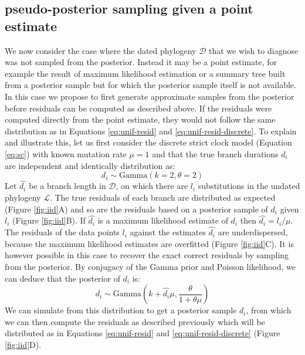 \documentclass{article}
\begin{document}
\subsection*{pseudo-posterior sampling given a point estimate}

We now consider the case where the dated phylogeny $\mathcal{D}$ that we wish
to diagnose was not sampled from the posterior. Instead it may be a point estimate, 
for example the result of maximum likelihood estimation
or a summary tree built from a posterior sample \citep{heledLookingTreesForest2013}
but for which the posterior sample itself is not available.
In this case we propose to first generate approximate 
samples from the posterior before residuals can be computed as described above.
If the residuals were computed directly from the point estimate, they would not follow the same distribution as in Equations
\ref{eq:unif-resid} and \ref{eq:unif-resid-discrete}.
To explain and illustrate this, let us first consider the discrete strict clock model (Equation \ref{eq:sc})
with known mutation rate $\mu=1$
and that the true branch durations $d_i$ are independent and identically
distribution as:
\begin{equation}
d_i \sim \mathrm{Gamma}(k=2,\theta=2)
\end{equation}
Let $\hat{d_i}$ be a branch length in $\mathcal{D}$, on which there are $l_i$ substitutions in the undated phylogeny $\mathcal{L}$. 
The true residuals of each branch are distributed as expected (Figure \ref{fig:iid}A)
and so are the residuals based on a posterior sample of $d_i$ given $l_i$ (Figure \ref{fig:iid}B).
If $\hat{d_i}$ is a maximum likelihood estimate of $d_i$ then
$\hat{d_i}=l_i/\mu$.
The residuals of the data points $l_i$ against the estimates $\hat{d_i}$ are
underdispersed, because the maximum likelihood estimates are overfitted (Figure \ref{fig:iid}C).
It is however possible in this case to recover the exact correct residuals by sampling from
the posterior. 
By conjugacy of the Gamma prior and Poisson likelihood, we can deduce that the posterior of $d_i$ is:
\begin{equation}
d_i \sim \mathrm{Gamma}\left(k+\hat{d_i} \mu,\frac{\theta}{1+\theta \mu}\right)
\end{equation}
We can simulate from this distribution to get a posterior sample $d_i$, from which we can then compute the residuals as 
described previously which will be distributed as in 
Equations \ref{eq:unif-resid} and \ref{eq:unif-resid-discrete} (Figure \ref{fig:iid}D).
\end{document}
